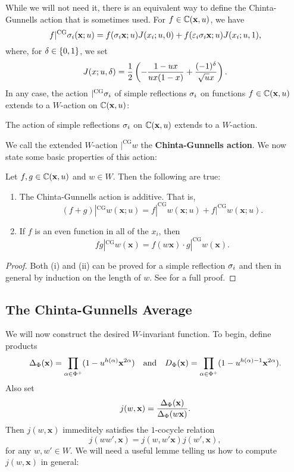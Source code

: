 \documentclass[12pt,reqno,oneside]{amsart}
\begin{document}
        While we will not need it, there is an equivalent way to define the Chinta-Gunnells action that is sometimes used. For $f \in \mathbb{C}(\mathbf{x},u)$, we have
        \[
            f|^{\mathrm{CG}}\sigma_{i}(\mathbf{x};u) = f(\sigma_{i}\mathbf{x};u)J(x_{i};u,0)+f(\varepsilon_{i}\sigma_{i}\mathbf{x};u)J(x_{i};u,1),
        \]
        where, for $\delta \in \{0,1\}$, we set
        \[
            J(x;u,\delta) = \frac{1}{2}\left(-\frac{1-ux}{ux(1-x)}+\frac{(-1)^{\delta}}{\sqrt{u}x}\right).
        \]
        In any case, the action $|^{\mathrm{CG}}\sigma_{i}$ of simple reflections $\sigma_{i}$ on functions $f \in \mathbb{C}(\mathbf{x},u)$ extends to a $W$-action on $\mathbb{C}(\mathbf{x},u)$:

        \begin{proposition}
        The action of simple reflections $\sigma_{i}$ on $\mathbb{C}(\mathbf{x},u)$ extends to a $W$-action.
        \end{proposition}
 
        We call the extended $W$-action $|^{\mathrm{CG}}w$ the \textbf{Chinta-Gunnells action}. We now state some basic properties of this action:

        \begin{proposition}\label{prop:CG_properties}
            Let $f,g \in \mathbb{C}(\mathbf{x},u)$ and $w \in W$. Then the following are true:
            \begin{enumerate}[label=(\roman*)]
                \item The Chinta-Gunnells action is additive. That is,
                \[
                    (f+g)|^{\mathrm{CG}}w(\mathbf{x};u) = f|^{\mathrm{CG}}w(\mathbf{x};u)+f|^{\mathrm{CG}}w(\mathbf{x};u).
                \]
                \item If $f$ is an even function in all of the $x_{i}$, then
                \[
                    fg|^{\mathrm{CG}}w(\mathbf{x}) = f(w\mathbf{x}) \cdot g|^{\mathrm{CG}}w(\mathbf{x}).
                \]
            \end{enumerate}
        \end{proposition}
        \begin{proof}
            Both (i) and (ii) can be proved for a simple reflection $\sigma_{i}$ and then in general by induction on the length of $w$. See \cite{CFG} for a full proof.
        \end{proof}
    \subsection*{The Chinta-Gunnells Average}
        We will now construct the desired $W$-invariant function. To begin, define products
        \[
            \Delta_{\Phi}(\mathbf{x}) = \prod_{\alpha \in \Phi^{+}}(1-u^{h(\alpha)}\mathbf{x}^{2\alpha}) \quad \text{and} \quad  D_{\Phi}(\mathbf{x}) = \prod_{\alpha \in \Phi^{+}}(1-u^{h(\alpha)-1}\mathbf{x}^{2\alpha}).
        \]
        Also set
        \[
            j(w,\mathbf{x}) = \frac{\Delta_{\Phi}(\mathbf{x})}{\Delta_{\Phi}(w\mathbf{x})}.
        \]
        Then $j(w,\mathbf{x})$ immeditely satisfies the $1$-cocycle relation
        \[
            j(ww',\mathbf{x}) = j(w,w'\mathbf{x})j(w',\mathbf{x}),
        \]
        for any $w,w' \in W$. We will need a useful lemme telling us how to compute $j(w,\mathbf{x})$ in general:
\end{document}
